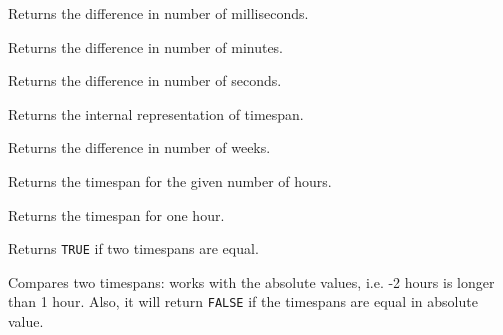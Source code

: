 Returns the difference in number of milliseconds.

\label{wxtimespangetminutes}


Returns the difference in number of minutes.

\label{wxtimespangetseconds}


Returns the difference in number of seconds.

\label{wxtimespangetvalue}


Returns the internal representation of timespan.

\label{wxtimespangetweeks}


Returns the difference in number of weeks.

\label{wxtimespanhours}


Returns the timespan for the given number of hours.

\label{wxtimespanhour}


Returns the timespan for one hour.

\label{wxtimespanisequalto}


Returns {\tt TRUE} if two timespans are equal.

\label{wxtimespanislongerthan}


Compares two timespans: works with the absolute values, i.e. -2
hours is longer than 1 hour. Also, it will return {\tt FALSE} if
the timespans are equal in absolute value.

\label{wxtimespanisnegative}


